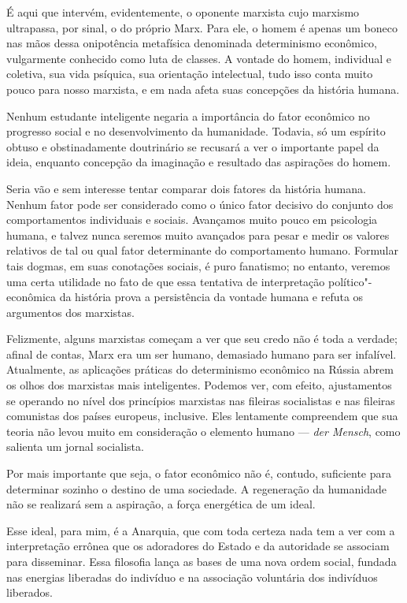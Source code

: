 É aqui que intervém, evidentemente, o oponente marxista cujo marxismo
ultrapassa, por sinal, o do próprio Marx. Para ele, o homem é apenas
um boneco nas mãos dessa onipotência metafísica denominada determinismo
econômico, vulgarmente conhecido como luta de classes. A vontade do
homem, individual e coletiva, sua vida psíquica, sua orientação
intelectual, tudo isso conta muito pouco para nosso marxista, e em nada
afeta suas concepções da história humana.

Nenhum estudante inteligente negaria a importância do fator econômico no
progresso social e no desenvolvimento da humanidade. Todavia, só um
espírito obtuso e obstinadamente doutrinário se recusará a ver o
importante papel da ideia, enquanto concepção da imaginação e resultado
das aspirações do homem.

Seria vão e sem interesse tentar comparar dois fatores da história
humana. Nenhum fator pode ser considerado como o único fator decisivo
do conjunto dos comportamentos individuais e sociais. Avançamos muito
pouco em psicologia humana, e talvez nunca seremos muito avançados para
pesar e medir os valores relativos de tal ou qual fator determinante do
comportamento humano. Formular tais dogmas, em suas conotações sociais,
é puro fanatismo; no entanto, veremos uma certa utilidade no fato de
que essa tentativa de interpretação político"-econômica da história
prova a persistência da vontade humana e refuta os argumentos dos
marxistas.

Felizmente, alguns marxistas começam a ver que seu credo não é toda a
verdade; afinal de contas, Marx era um ser humano, demasiado humano
para ser infalível. Atualmente, as aplicações práticas do determinismo econômico na
Rússia abrem os olhos dos marxistas mais inteligentes.
Podemos ver, com efeito, ajustamentos se operando no nível dos
princípios marxistas nas fileiras socialistas e nas
fileiras comunistas dos países europeus, inclusive. Eles lentamente compreendem
que sua teoria não levou muito em consideração o elemento humano --- 
\textit{der Mensch}, como salienta um jornal socialista.

Por mais importante que seja, o fator econômico não é, contudo,
suficiente para determinar sozinho o destino de uma sociedade. A
regeneração da humanidade não se realizará sem a aspiração, a força
energética de um ideal.

Esse ideal, para mim, é a Anarquia, que com toda certeza nada tem a ver
com a interpretação errônea que os adoradores do Estado e da autoridade
se associam para disseminar. Essa filosofia lança as bases de uma nova
ordem social, fundada nas energias liberadas do indivíduo e na
associação voluntária dos indivíduos liberados.

